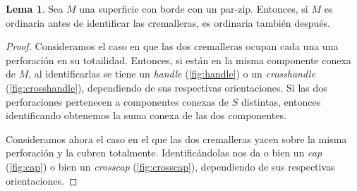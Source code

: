 \documentclass[10pt]{report}
\theoremstyle{definition}
\newtheorem{lema}[defin]{Lema}
\begin{document}
\begin{lema}%
Sea $M$ una superficie con borde con un par-zip. Entonces, si $M$ es ordinaria antes de identificar las cremalleras, es ordinaria también después.\label{lema:superficie_ordinaria}
\end{lema}
\begin{proof}
Consideramos el caso en que las dos cremalleras ocupan cada una una perforación en su totailidad. Entonces, si están en la misma componente conexa de $M$, al identificarlas se tiene un \textit{handle} (\autoref{fig:handle}) o un \textit{crosshandle} (\autoref{fig:crosshandle}), dependiendo de sus respectivas orientaciones. Si las dos perforaciones pertenecen a componentes conexas de $S$ distintas, entonces identificando obtenemos la suma conexa de las dos componentes. 

Consideramos ahora el caso en el que las dos cremalleras yacen sobre la misma perforación y la cubren totalmente. Identificándolas nos da o bien un \textit{cap} (\autoref{fig:cap}) o bien un \textit{crosscap} (\autoref{fig:crosscap}), dependiendo de sus respectivas orientaciones.


\end{proof}
\end{document}
